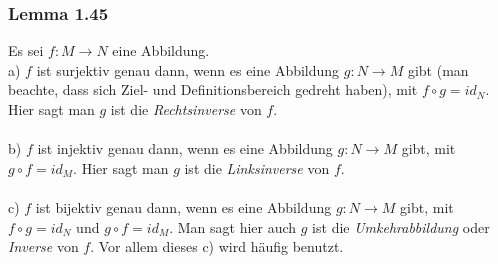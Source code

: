 \documentclass{article}
\begin{document}
\subsubsection*{Lemma 1.45}
Es sei $f: M \rightarrow N$ eine Abbildung. \\
a) $f$ ist surjektiv genau dann, wenn es eine Abbildung $g: N \rightarrow M$ gibt (man beachte, dass sich Ziel- und Definitionsbereich gedreht haben), mit $f \circ g = id_N$. Hier sagt man $g$ ist die \textit{Rechtsinverse} von $f$. \\
\\
b) $f$ ist injektiv genau dann, wenn es eine Abbildung $g: N \rightarrow M$ gibt, mit $g \circ f = id_M$. Hier sagt man $g$ ist die \textit{Linksinverse} von $f$. \\
\\
c) $f$ ist bijektiv genau dann, wenn es eine Abbildung $g: N \rightarrow M$ gibt, mit $f \circ g = id_N$ und $g \circ f = id_M$. Man sagt hier auch $g$ ist die \textit{Umkehrabbildung} oder \textit{Inverse} von $f$. Vor allem dieses c) wird häufig benutzt.\\
\end{document}
